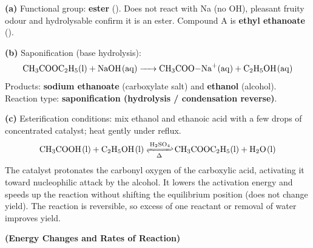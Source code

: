 \documentclass[addpoints]{exam}
\begin{document}
\begin{questions}
\begin{solution}[10cm]
\textbf{(a)} Functional group: \textbf{ester} (). Does not react with Na (no OH),
pleasant fruity odour and hydrolysable confirm it is an ester. Compound A is
\textbf{ethyl ethanoate} ().

\textbf{(b)} Saponification (base hydrolysis):
\[
\ce{CH3COOC2H5(l) + NaOH(aq) -> CH3COO-Na+(aq) + C2H5OH(aq)}
\]
Products: \textbf{sodium ethanoate} (carboxylate salt) and \textbf{ethanol} (alcohol).
Reaction type: \textbf{saponification (hydrolysis / condensation reverse)}.

\textbf{(c)} Esterification conditions: mix ethanol and ethanoic acid with a few drops of
concentrated  catalyst; heat gently under reflux.
\[
\ce{CH3COOH(l) + C2H5OH(l) <=>[H2SO4][\Delta] CH3COOC2H5(l) + H2O(l)}
\]
The  catalyst protonates the carbonyl oxygen of the carboxylic acid, activating it
toward nucleophilic attack by the alcohol. It lowers the activation energy and speeds up the
reaction without shifting the equilibrium position (does not change yield). The reaction is
reversible, so excess of one reactant or removal of water improves yield.
\end{solution}

\question \textbf{(Energy Changes and Rates of Reaction)}
\end{questions}
\end{document}
